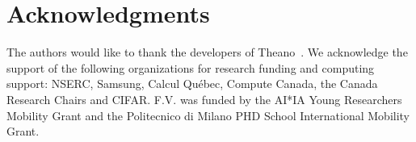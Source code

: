 \section*{Acknowledgments}

The authors would like to thank the developers of
Theano~\citep{Bergstra2010,Bastien2012}. We acknowledge the support of the
following organizations for research funding and computing support: NSERC,
Samsung, Calcul Qu\'{e}bec, Compute Canada, the Canada Research Chairs and
CIFAR.  F.V. was funded by the AI*IA Young Researchers Mobility Grant
and the Politecnico di Milano PHD School International Mobility Grant.



